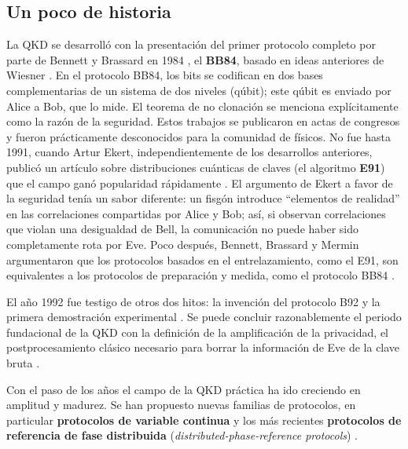 \documentclass[a4paper,11pt]{book} %
\numberwithin{equation}{chapter}
\begin{document}
		
		\subsection{Un poco de historia}

La QKD se desarrolló con la presentación del primer protocolo completo por parte de Bennett y Brassard en 1984 \cite{BB84}, el \textbf{BB84}, basado en ideas anteriores de Wiesner \cite{BB84_Wiesner_1983}. En el protocolo BB84, los bits se codifican en dos bases complementarias de un sistema de dos niveles (qúbit); este qúbit es enviado por Alice a Bob, que lo mide. El teorema de no clonación se menciona explícitamente como la razón de la seguridad. Estos trabajos se publicaron en actas de congresos y fueron prácticamente desconocidos para la comunidad de físicos. No fue hasta 1991, cuando Artur Ekert, independientemente de los desarrollos anteriores, publicó un artículo sobre distribuciones cuánticas de claves (el algoritmo \textbf{E91}) que el campo ganó popularidad rápidamente \cite{Ekert-1991}. El argumento de Ekert a favor de la seguridad tenía un sabor diferente: un fisgón introduce ``elementos de realidad'' en las correlaciones compartidas por Alice y Bob; así, si observan correlaciones que violan una desigualdad de Bell, la comunicación no puede haber sido completamente rota por Eve. Poco después, Bennett, Brassard y Mermin argumentaron que los protocolos basados en el entrelazamiento, como el E91, son equivalentes a los protocolos de preparación y medida, como el protocolo BB84  \cite{BB84_E91_iguales}. 

El año 1992 fue testigo de otros dos hitos: la invención del protocolo B92 \cite{B92} y la primera demostración experimental \cite{experiment_QKD}. Se puede concluir razonablemente el periodo fundacional de la QKD con la definición de la amplificación de la privacidad, el postprocesamiento clásico necesario para borrar la información de Eve de la clave bruta \cite{Privacy_amplification}.

Con el paso de los años el campo de la QKD práctica ha ido creciendo en amplitud y madurez. Se han propuesto nuevas familias de protocolos, en particular \textbf{protocolos de variable continua} \cite{Continue_var_Ralph_1999, Continue_var_Hillery_2000, Continue_var_Cerf_2001, Continue_var_Gottesman_2001, Continue_var_Grosshans_2002, Continue_var_Silberhorn_2002} y los más recientes \textbf{protocolos de referencia de fase distribuida} (\textit{distributed-phase-reference protocols}) \cite{Phase_Inoue_2002, Phase_Stucki_2005}. 
\end{document}
